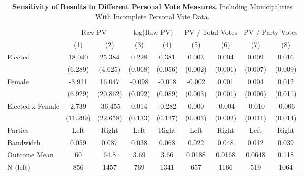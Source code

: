 \begin{table}[!h]

\caption{\label{tab:norway_pv_check_no_drop} \textbf{Sensitivity of Results to Different Personal Vote Measures.} Including Municipalities With Incomplete Personal Vote Data. }
\centering
\fontsize{9}{11}\selectfont
\begin{threeparttable}
\begin{tabular}[t]{lcccccccc}
\toprule
\multicolumn{1}{c}{ } & \multicolumn{2}{c}{Raw PV} & \multicolumn{2}{c}{log(Raw PV)} & \multicolumn{2}{c}{PV / Total Votes} & \multicolumn{2}{c}{PV / Party Votes} \\
\cmidrule(l{3pt}r{3pt}){2-3} \cmidrule(l{3pt}r{3pt}){4-5} \cmidrule(l{3pt}r{3pt}){6-7} \cmidrule(l{3pt}r{3pt}){8-9}
  & \multicolumn{1}{c}{(1)} & \multicolumn{1}{c}{(2)} & \multicolumn{1}{c}{(3)} & \multicolumn{1}{c}{(4)} & \multicolumn{1}{c}{(5)} & \multicolumn{1}{c}{(6)} & \multicolumn{1}{c}{(7)} & \multicolumn{1}{c}{(8)}\\
\midrule
Elected & 18.040 & 25.384 & 0.228 & 0.381 & 0.003 & 0.004 & 0.009 & 0.016\\
 & (6.289) & (4.625) & (0.068) & (0.056) & (0.002) & (0.001) & (0.007) & (0.009)\\
\addlinespace
Female & -3.911 & 16.047 & -0.098 & -0.018 & -0.002 & 0.001 & 0.004 & 0.012\\
 & (6.929) & (20.862) & (0.092) & (0.089) & (0.003) & (0.001) & (0.006) & (0.011)\\
\addlinespace
Elected x Female & 2.739 & -36.455 & 0.014 & -0.282 & 0.000 & -0.004 & -0.010 & -0.006\\
 & (11.299) & (22.658) & (0.133) & (0.127) & (0.003) & (0.002) & (0.011) & (0.014)\\
\addlinespace \midrule \addlinespace
\addlinespace
Parties & \multicolumn{1}{c}{Left} & \multicolumn{1}{c}{Right} & \multicolumn{1}{c}{Left} & \multicolumn{1}{c}{Right} & \multicolumn{1}{c}{Left} & \multicolumn{1}{c}{Right} & \multicolumn{1}{c}{Left} & \multicolumn{1}{c}{Right}\\
Bandwidth & 0.059 & 0.087 & 0.038 & 0.068 & 0.022 & 0.048 & 0.012 & 0.039\\
Outcome Mean & 60 & 64.8 & 3.69 & 3.66 & 0.0188 & 0.0168 & 0.0648 & 0.118\\
N (left) & \multicolumn{1}{c}{856} & \multicolumn{1}{c}{1457} & \multicolumn{1}{c}{769} & \multicolumn{1}{c}{1341} & \multicolumn{1}{c}{657} & \multicolumn{1}{c}{1166} & \multicolumn{1}{c}{519} & \multicolumn{1}{c}{1064}\\

\end{tabular}
\end{threeparttable}
\end{table}
